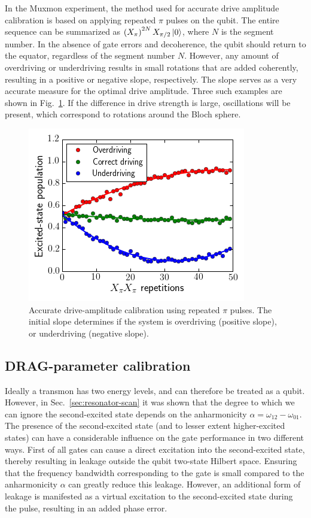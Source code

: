         In the Muxmon experiment, the method used for accurate drive amplitude calibration is based on applying repeated $\pi$ pulses on the qubit. The entire sequence can be summarized as $\left( X_{\pi} \right)^{2N} X_{\pi/2} \ket{0}$, where $N$ is the segment number. In the absence of gate errors and decoherence, the qubit should return to the equator, regardless of the segment number $N$. However, any amount of overdriving or underdriving results in small rotations that are added coherently, resulting in a positive or negative slope, respectively. The slope serves as a very accurate measure for the optimal drive amplitude. Three such examples are shown in Fig.~\ref{fig:PiX360}. If the difference in drive strength is large, oscillations will be present, which correspond to rotations around the Bloch sphere.
        \begin{figure}[h]
          \centering
          \includegraphics[width=.5\linewidth]{Figures/Calibration routines/Drive calibration.png}
          \caption{Accurate drive-amplitude calibration using repeated $\pi$ pulses. The initial slope determines if the system is overdriving (positive slope), or underdriving (negative slope).}
          \label{fig:PiX360}
        \end{figure}

      \subsection{DRAG-parameter calibration}
        \label{ssec:DRAG-parameter calibration}

        Ideally a transmon has two energy levels, and can therefore be treated as a qubit. However, in Sec.~\ref{sec:resonator-scan} it was shown that the degree to which we can ignore the second-excited state depends on the anharmonicity $\alpha=\omega_{12} - \omega_{01}$.  The presence of the second-excited state (and to lesser extent higher-excited states) can have a considerable influence on the gate performance in two different ways. First of all gates can cause a direct excitation into the second-excited state, thereby resulting in leakage outside the qubit two-state Hilbert space. Ensuring that the frequency bandwidth corresponding to the gate is small compared to the anharmonicity $\alpha$ can greatly reduce this leakage. However, an additional form of leakage is manifested as a virtual excitation to the second-excited state during the pulse, resulting in an added phase error.

